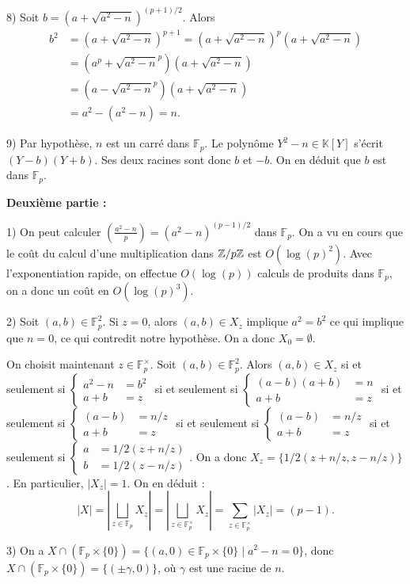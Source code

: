 \documentclass[11pt,a4paper]{article}
\newcommand{\F}{\mathbb{F}}
\newcommand{\KK}{\mathbb{K}}
\begin{document}
8) Soit  $b=(a+\sqrt{a^2-n})^{(p+1)/2}$. Alors \begin{align*}b^2&=(a+\sqrt{a^2-n})^{p+1}=(a+\sqrt{a^2-n})^{p}(a+\sqrt{a^2-n})\\
&=(a^p+\sqrt{a^2-n}^p)(a+\sqrt{a^2-n})\\
&=(a-\sqrt{a^2-n}^p)(a+\sqrt{a^2-n})\\
&= a^2-(a^2-n)=n.
\end{align*} 


9) Par hypothèse, $n$ est un carré dans $\F_p$.   Le polynôme $Y^2-n\in \KK[Y]$ s'écrit $(Y-b)(Y+b)$. Ses deux racines sont donc $b$ et $-b$. On en déduit que $b$ est dans $\F_p$.

\textbf{Deuxième partie :}


1) On peut calculer $\left(\frac{a^2-n}{p}\right)=(a^2-n)^{(p-1)/2}$ dans $\F_p$. On a vu en cours que le coût du calcul d'une multiplication dans $\mathbb{Z}/p\mathbb{Z}$ est $O(\log(p)^2)$. Avec l'exponentiation rapide, on effectue $O(\log(p))$ calculs de produits dans $\F_p$, on a donc un coût en $O(\log(p)^3)$. 

2) Soit $(a,b)\in \F_p^2$. Si $z=0$, alors $(a,b)\in X_z$ implique $a^2=b^2$ ce qui implique que $n=0$, ce qui contredit notre hypothèse. On a donc $X_0=\emptyset$. 

On choisit maintenant $z\in \F_p^\times$. Soit $(a,b)\in \F_p^2$. Alors $(a,b)\in X_z$ si et seulement si $\begin{cases} a^2-n&=b^2\\ a+b &=z \end{cases}$ si et seulement si $\begin{cases} (a-b)(a+b)&=n\\ a+b &=z \end{cases}$ si et seulement si $\begin{cases} (a-b)&=n/z\\ a+b &=z \end{cases}$ si et seulement si $\begin{cases} (a-b)&=n/z\\ a+b &=z \end{cases}$ si et seulement si $\begin{cases} a&=1/2(z+n/z)\\  b &=1/2(z-n/z) \end{cases}$. On a donc $X_z=\{1/2(z+n/z,z-n/z)\}$. En particulier, $|X_z|=1$. On en déduit :  \[|X|=|\bigsqcup_{z\in \F_p} X_z|=|\bigsqcup_{z\in \F_p^\times} X_z|=\sum_{z\in \F_p^\times} |X_z|=(p-1).\]

3) On a $X\cap (\F_p\times \{0\})=\{(a,0)\in \F_p\times \{0\}\mid a^2-n=0\}$, donc $X\cap (\F_p\times \{0\})=\{(\pm \gamma,0)\}$, où $\gamma$ est une racine de $n$.
\end{document}
